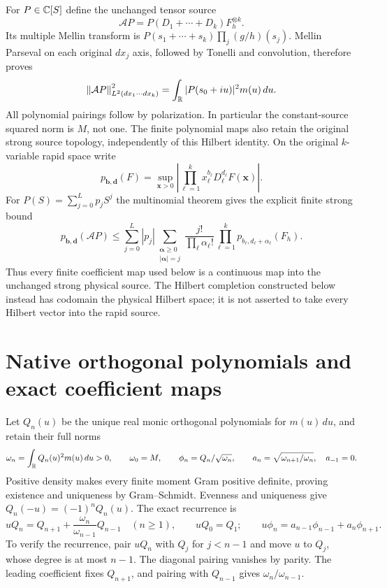 \documentclass[11pt]{article}
\begin{document}
For $P\in\mathbb C[S]$ define the unchanged tensor source
\begin{equation}\label{swlie:eq:physical}
 \mathcal A P=P(D_1+\cdots+D_k)F_h^{\otimes k}.
\end{equation}
Its multiple Mellin transform is
$P(s_1+\cdots+s_k)\prod_j(g/h)(s_j)$.
Mellin Parseval on each original $dx_j$ axis, followed by
Tonelli and convolution, therefore proves
\begin{equation}\label{swlie:eq:isometry}
 \left\lVert\mathcal A P\right\rVert_{L^2(dx_1\cdots dx_k)}^2
  =\int_\mathbb R|P(s_0+iu)|^2m(u)\,du.
\end{equation}
All polynomial pairings follow by polarization.
In particular the constant-source squared norm is $M$, not one.
The finite polynomial maps also retain the original strong
source topology, independently of this Hilbert identity.
On the original $k$-variable rapid space write
\[
 p_{\boldsymbol b,\boldsymbol d}(F)
 =\sup_{\boldsymbol x>0}
       \left|\prod_{\ell=1}^k x_\ell^{b_\ell}
                    D_\ell^{d_\ell}F(\boldsymbol x)\right|.
\]
For $P(S)=\sum_{j=0}^L p_jS^j$ the multinomial theorem gives
the explicit finite strong bound
\begin{equation}\label{swlie:eq:strongfinite}
 p_{\boldsymbol b,\boldsymbol d}(\mathcal A P)
 \leq\sum_{j=0}^L|p_j|
       \sum_{\substack{\boldsymbol\alpha\geq0\\|\boldsymbol\alpha|=j}}
       \frac{j!}{\prod_\ell\alpha_\ell!}
       \prod_{\ell=1}^k
                  p_{b_\ell,d_\ell+\alpha_\ell}(F_h).
\end{equation}
Thus every finite coefficient map used below is a continuous
map into the unchanged strong physical source.
The Hilbert completion constructed below instead has
codomain the physical Hilbert space; it is not asserted
to take every Hilbert vector into the rapid source.

\section{Native orthogonal polynomials and exact coefficient maps}

Let $Q_n(u)$ be the unique real monic orthogonal polynomials for
$m(u)\,du$, and retain their full norms
\begin{equation}\label{swlie:eq:norms}
 \omega_n=\int_\mathbb R Q_n(u)^2m(u)\,du>0,\qquad
 \omega_0=M,\qquad
 \phi_n=Q_n/\sqrt{\omega_n},\qquad
 a_n=\sqrt{\omega_{n+1}/\omega_n},\quad a_{-1}=0.
\end{equation}
Positive density makes every finite moment Gram positive
definite, proving existence and uniqueness by Gram--Schmidt.
Evenness and uniqueness give $Q_n(-u)=(-1)^nQ_n(u)$.
The exact recurrence is
\begin{equation}\label{swlie:eq:recurrence}
 uQ_n=Q_{n+1}+\frac{\omega_n}{\omega_{n-1}}Q_{n-1}
 \quad(n\geq1),\qquad uQ_0=Q_1;
 \qquad
 u\phi_n=a_{n-1}\phi_{n-1}+a_n\phi_{n+1}.
\end{equation}
To verify the recurrence, pair $uQ_n$ with $Q_j$ for $j<n-1$
and move $u$ to $Q_j$, whose degree is at most $n-1$.
The diagonal pairing vanishes by parity. The leading
coefficient fixes $Q_{n+1}$, and pairing with $Q_{n-1}$
gives $\omega_n/\omega_{n-1}$.
\end{document}
